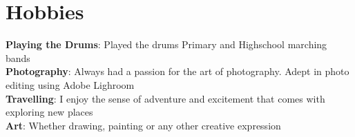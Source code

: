 \documentclass[letterpaper,11pt]{article}
\begin{document}
 
 


\vspace*{0.2cm}
\section{Hobbies}

\begin{itemize}[leftmargin=0.15in, label={}]
    \small{\item{
     \textbf{Playing the Drums}{: Played the drums Primary and Highschool marching bands} \\
     \textbf{Photography}{: Always had a passion for the art of photography. Adept in photo editing using Adobe Lighroom} \\
     \textbf{Travelling}{: I enjoy the sense of adventure and excitement that comes with exploring new places} \\
     \textbf{Art}{: Whether drawing, painting or any other creative expression} \\
    }}
 \end{itemize}
 
\end{document}

